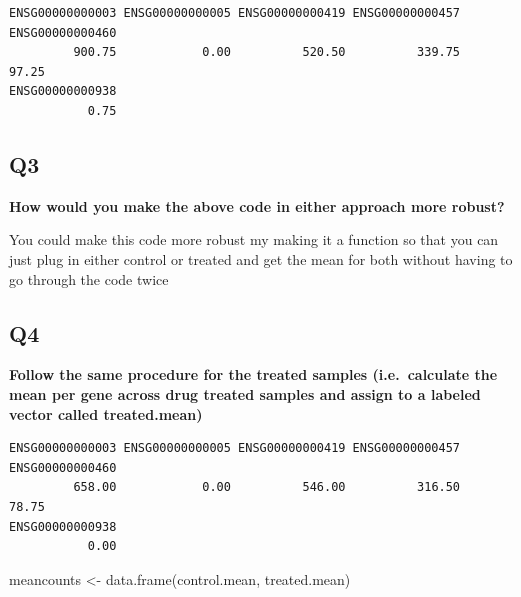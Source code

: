 \documentclass[
  letterpaper,
  DIV=11,
  numbers=noendperiod]{scrartcl}
\newenvironment{Shaded}{\begin{snugshade}}{\end{snugshade}}
\newcommand{\DecValTok}[1]{\textcolor[rgb]{0.68,0.00,0.00}{#1}}
\newcommand{\FunctionTok}[1]{\textcolor[rgb]{0.28,0.35,0.67}{#1}}
\newcommand{\NormalTok}[1]{\textcolor[rgb]{0.00,0.23,0.31}{#1}}
\newcommand{\OtherTok}[1]{\textcolor[rgb]{0.00,0.23,0.31}{#1}}
\newcommand{\SpecialCharTok}[1]{\textcolor[rgb]{0.37,0.37,0.37}{#1}}
\newcommand{\StringTok}[1]{\textcolor[rgb]{0.13,0.47,0.30}{#1}}
\begin{document}
\begin{verbatim}
ENSG00000000003 ENSG00000000005 ENSG00000000419 ENSG00000000457 ENSG00000000460 
         900.75            0.00          520.50          339.75           97.25 
ENSG00000000938 
           0.75 
\end{verbatim}

\hypertarget{q3}{%
\subsection{\texorpdfstring{\textbf{Q3}}{Q3}}\label{q3}}

\textbf{How would you make the above code in either approach more
robust?}

You could make this code more robust my making it a function so that you
can just plug in either control or treated and get the mean for both
without having to go through the code twice

\hypertarget{q4}{%
\subsection{\texorpdfstring{\textbf{Q4}}{Q4}}\label{q4}}

\textbf{Follow the same procedure for the treated samples
(i.e.~calculate the mean per gene across drug treated samples and assign
to a labeled vector called treated.mean)}

\begin{Shaded}
\end{Shaded}

\begin{verbatim}
ENSG00000000003 ENSG00000000005 ENSG00000000419 ENSG00000000457 ENSG00000000460 
         658.00            0.00          546.00          316.50           78.75 
ENSG00000000938 
           0.00 
\end{verbatim}

\begin{Shaded}
\begin{Highlighting}[]
\NormalTok{meancounts }\OtherTok{\textless{}{-}} \FunctionTok{data.frame}\NormalTok{(control.mean, treated.mean)}
\end{Highlighting}
\end{Shaded}
\end{document}
